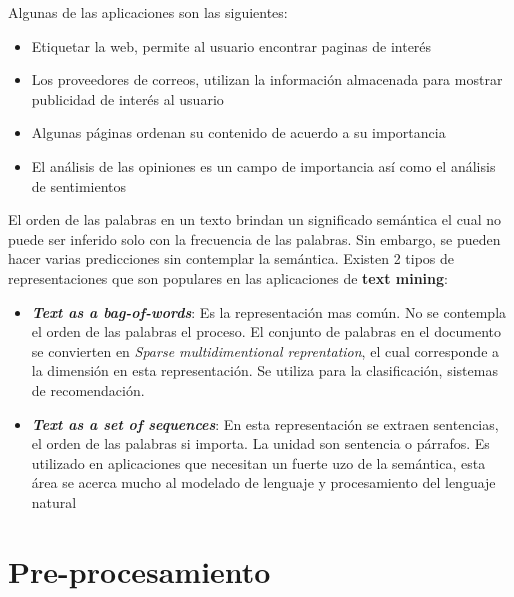Algunas de las aplicaciones son las siguientes:

\begin{itemize}

	\item Etiquetar la web, permite al usuario encontrar paginas de interés

	\item Los proveedores de correos, utilizan la información almacenada para mostrar publicidad de interés al usuario

	\item Algunas páginas ordenan su contenido de acuerdo a su importancia

	\item El análisis de las opiniones es un campo de importancia así como el análisis de sentimientos		

\end{itemize}



El orden de las palabras en un texto brindan un significado semántica el cual no puede ser inferido  solo con la frecuencia de las palabras. Sin embargo, se pueden hacer varias predicciones sin contemplar la semántica. Existen 2 tipos de representaciones que son populares en las aplicaciones de \textbf{text mining}:

\begin{itemize}
	
	\item \textbf{\textit{Text as a bag-of-words}}: Es la representación mas común. No se contempla el orden de las palabras el proceso. El conjunto de palabras en el documento se convierten en \textit{Sparse multidimentional reprentation}, el cual corresponde a la dimensión en esta representación. Se utiliza para la clasificación, sistemas de recomendación.

	\item \textbf{\textit{Text as a set of sequences}}: En esta representación se extraen sentencias, el orden de las palabras si importa. La unidad son sentencia o párrafos. Es utilizado en aplicaciones que necesitan un fuerte uzo de la semántica, esta área se acerca mucho al modelado de lenguaje y procesamiento del lenguaje natural

\end{itemize}


\section[Pre-procesamiento]{Pre-procesamiento}

